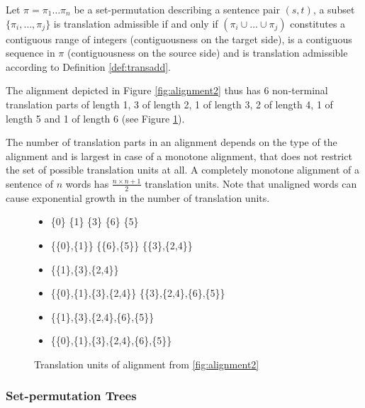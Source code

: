 \documentclass{report}
\begin{document}
\begin{definition}\label{def:transpart}
Let $\pi = \pi_1 \ldots \pi_n$ be a set-permutation describing a sentence pair $(s,t)$, a subset $\{\pi_i,\ldots,\pi_j\}$ is translation admissible if and only if $(\pi_i\cup \ldots \cup \pi_j)$ constitutes a contiguous range of integers (contiguousness on the target side), is a contiguous sequence in $\pi$ (contiguousness on the source side) and is translation admissible according to Definition \ref{def:transadd}.
\end{definition}

The alignment depicted in Figure \ref{fig:alignment2} thus has 6 non-terminal translation parts of length 1, 3 of length 2, 1 of length 3, 2 of length 4, 1 of length 5 and 1 of length 6 (see Figure \ref{fig:transequi}).

The number of translation parts in an alignment depends on the type of the alignment and is largest in case of a monotone alignment, that does not restrict the set of possible translation units at all. A completely monotone alignment of a sentence of $n$ words has $\frac{n\times n+1}{2}$ translation units. Note that unaligned words can cause exponential growth in the number of translation units.

\begin{figure}[!ht]
\begin{framed}
\small{
\begin{itemize}
\item \{0\} \hfill \{1\} \hfill \{3\} \hfill \{6\} \hfill \{5\} \hfill
\item \{\{0\},\{1\}\} \hfill  \{\{6\},\{5\}\} \hfill \{\{3\},\{2,4\}\}
\item \{\{1\},\{3\},\{2,4\}\}
\item \{\{0\},\{1\},\{3\},\{2,4\}\} \hfill \{\{3\},\{2,4\},\{6\},\{5\}\}
\item \{\{1\},\{3\},\{2,4\},\{6\},\{5\}\}
\item \{\{0\},\{1\},\{3\},\{2,4\},\{6\},\{5\}\}
\end{itemize}
}
\end{framed}
\caption{Translation units of alignment from \ref{fig:alignment2}}\label{fig:transequi}
\end{figure}

\subsubsection{Set-permutation Trees}
\end{document}
